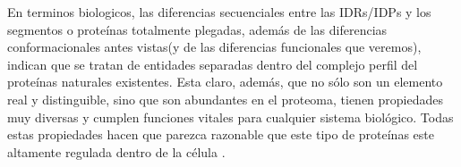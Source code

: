 





En terminos biologicos, las diferencias secuenciales entre las IDRs/IDPs y los segmentos o proteínas totalmente plegadas, además de las diferencias conformacionales antes vistas(y de las diferencias funcionales que veremos), 
indican que se tratan de entidades separadas dentro del complejo perfil del proteínas naturales existentes.
Esta claro, además, que no sólo son un elemento real y distinguible, sino que son abundantes en el proteoma, tienen propiedades muy diversas y cumplen funciones vitales para cualquier sistema biológico.
Todas estas propiedades hacen que parezca razonable que este tipo de proteínas este altamente regulada dentro de la célula \cite{gsponer2008tight,habchi2014introducing}.






















































